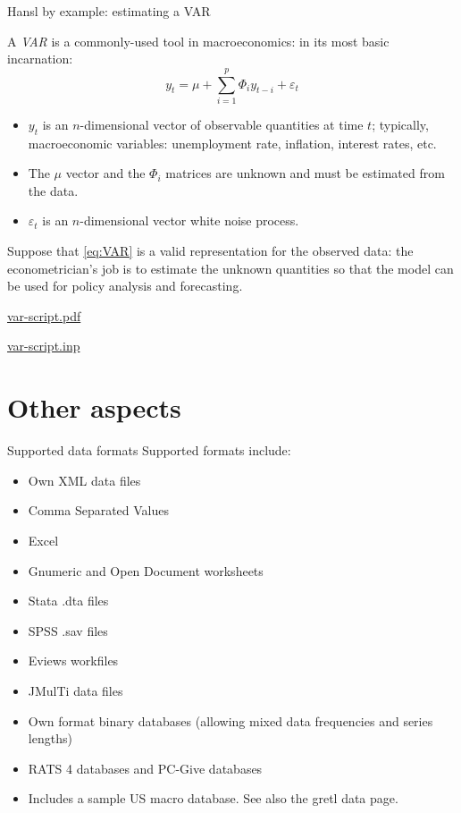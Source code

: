 \documentclass{beamer}[11pt]
\begin{document}
\begin{frame}{Hansl by example: estimating a VAR}
	
	A \emph{VAR} is a commonly-used tool in macroeconomics: in its most
	basic incarnation:
	\begin{equation}
	\label{eq:VAR}
	y_t = \mu + \sum_{i=1}^p \Phi_i y_{t-i} + \varepsilon_t
	\end{equation}
	
	\begin{itemize}
		\item $y_t$ is an $n$-dimensional vector of observable quantities at
		time $t$; typically, macroeconomic variables: unemployment rate,
		inflation, interest rates, etc.
		\item The $\mu$ vector and the $\Phi_i$ matrices are unknown and
		must be estimated from the data.
		\item $\varepsilon_t$ is an $n$-dimensional vector white noise
		process.
	\end{itemize}
	
	Suppose that \eqref{eq:VAR} is a valid representation for the
	observed data: the econometrician's job is to estimate the unknown
	quantities so that the model can be used for policy analysis and
	forecasting.
\end{frame}

\begin{frame}
	
	\url{var-script.pdf}
	
	\url{var-script.inp}
	
\end{frame}



\section{Other aspects}

\begin{frame}{Supported data formats}
	Supported formats include: 
	
	\begin{itemize}
		\item Own XML data files
		\item Comma Separated Values
		\item Excel
		\item Gnumeric and Open Document worksheets
		\item Stata .dta files
		\item SPSS .sav files
		\item Eviews workfiles
		\item JMulTi data files
		\item Own format binary databases (allowing mixed data frequencies and series lengths)
		\item RATS 4 databases and PC-Give databases
		\item Includes a sample US macro database. See also the gretl data page. 
	\end{itemize}
\end{frame}
\end{document}
